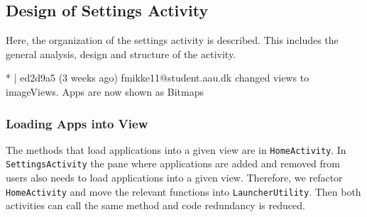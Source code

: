 \subsection{Design of Settings Activity}\label{sec:sprint3:designsettings}
Here, the organization of the settings activity is described.
This includes the general analysis, design and structure of the activity.



{\color{red}* | ed2d9a5 (3 weeks ago) fmikke11@student.aau.dk changed views to imageViews. Apps are now shown as Bitmaps}

\subsubsection{Loading Apps into View}\label{sec:sprint:designlauncher}

The methods that load applications into a given view are in \lstinline!HomeActivity!.
In \lstinline!SettingsActivity! the pane where applications are added and removed from users also needs to load applications into a given view.
Therefore, we refactor \lstinline!HomeActivity! and move the relevant functions into \lstinline!LauncherUtility!.
Then both activities can call the same method and code redundancy is reduced. 